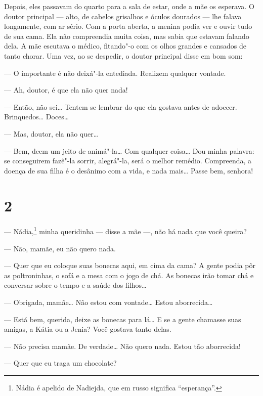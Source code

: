Depois, eles passavam do quarto para a sala de estar, onde a mãe os
esperava. O doutor principal --- alto, de cabelos grisalhos e óculos
dourados --- lhe falava longamente, com ar sério. Com a porta aberta, a
menina podia ver e ouvir tudo de sua cama. Ela não compreendia muita
coisa, mas sabia que estavam falando dela. A mãe escutava o médico,
fitando"-o com os olhos grandes e cansados de tanto chorar. Uma vez, ao
se despedir, o doutor principal disse em bom som:

--- O importante é não deixá"-la entediada. Realizem qualquer vontade.

--- Ah, doutor, é que ela não quer nada!

--- Então, não sei\ldots{} Tentem se lembrar do que ela gostava antes de
adoecer. Brinquedos\ldots{} Doces\ldots{}

--- Mas, doutor, ela não quer\ldots{}

--- Bem, deem um jeito de animá"-la\ldots{} Com qualquer coisa\ldots{} Dou minha
palavra: se conseguirem fazê"-la sorrir, alegrá"-la, será o melhor
remédio. Compreenda, a doença de sua filha é o desânimo com a vida, e
nada mais\ldots{} Passe bem, senhora!

\section{2}

--- Nádia,\footnote{Nádia é apelido de Nadiejda, que em russo
  significa ``esperança''.} minha queridinha --- disse a mãe ---, não há
nada que você queira?

--- Não, mamãe, eu não quero nada.

--- Quer que eu coloque suas bonecas aqui, em cima da cama? A gente
podia pôr as poltroninhas, o sofá e a mesa com o jogo de chá. As
bonecas irão tomar chá e conversar sobre o tempo e a saúde dos filhos\ldots{}

--- Obrigada, mamãe\ldots{} Não estou com vontade\ldots{} Estou aborrecida\ldots{}

--- Está bem, querida, deixe as bonecas para lá\ldots{} E se a gente chamasse
suas amigas, a Kátia ou a Jenia? Você gostava tanto delas.

--- Não precisa mamãe. De verdade\ldots{} Não quero nada. Estou tão
aborrecida!

--- Quer que eu traga um chocolate?



